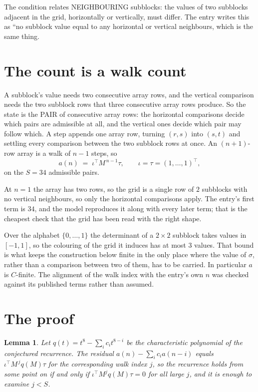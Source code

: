 \documentclass[11pt,a4paper]{article}
\theoremstyle{plain}
\newtheorem{lemma}[theorem]{Lemma}
\theoremstyle{definition}
\begin{document}
The condition relates NEIGHBOURING subblocks: the values of two subblocks adjacent in the grid,
horizontally or vertically, must differ. The entry writes this as ``no subblock value equal to any horizontal or vertical neighbours, which is the same thing.

\section{The count is a walk count}

A subblock's value needs two consecutive array rows, and the vertical
comparison needs the two subblock rows that three consecutive array rows produce. So the state
is the PAIR of consecutive array rows: the horizontal comparisons decide which pairs are
admissible at all, and the vertical ones decide which pair may follow which. A step appends one
array row, turning $(r,s)$ into $(s,t)$ and settling every comparison between the two subblock
rows at once. An $(n+1)$-row array is a walk of $n-1$ steps, so
\[
a(n)\;=\;\iota^{\!\top}M^{\,n-1}\tau,\qquad\iota=\tau=(1,\dots,1)^{\!\top},
\]
on the $S=34$ admissible pairs.

At $n=1$ the array has two rows, so the grid is a single row of $2$
subblocks with no vertical neighbours, so only the horizontal comparisons apply. The
entry's first term is $34$, and the model reproduces it along with every later term; that
is the cheapest check that the grid has been read with the right shape.

Over the alphabet $\{0,\dots,1\}$ the determinant of a $2\times2$ subblock takes values in
$[-1,1]$, so the colouring of the grid it induces has at most $3$ values.
That bound is what keeps the construction below finite in the only place where the value of
$\sigma$, rather than a comparison between two of them, has to be carried.
In particular $a$ is $C$-finite. The alignment of the walk index with the entry's own $n$ was
checked against its published terms rather than assumed.

\section{The proof}

\begin{lemma}\label{lem:crit}
Let $q(t)=t^{8}-\sum_i c_it^{8-i}$ be the characteristic polynomial of the
conjectured recurrence. The residual $a(n)-\sum_ic_ia(n-i)$ equals
$\iota^{\!\top}M^{\,j}q(M)\tau$ for the corresponding walk index $j$, so the recurrence
holds from some point on if and only if $\iota^{\!\top}M^{j}q(M)\tau=0$ for all large $j$,
and it is enough to examine $j<S$.
\end{lemma}
\end{document}
